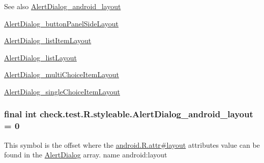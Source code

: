 \begin{DoxySeeAlso}{See also}
\hyperlink{classcheck_1_1test_1_1_r_1_1styleable_a3c776b8dc9750dc9868d3e65d915a53d}{Alert\+Dialog\+\_\+android\+\_\+layout} 

\hyperlink{classcheck_1_1test_1_1_r_1_1styleable_a929e9b246cebde3d26e0df79ede0734d}{Alert\+Dialog\+\_\+button\+Panel\+Side\+Layout} 

\hyperlink{classcheck_1_1test_1_1_r_1_1styleable_af8626e86eefaa84c9e393dc383c34a06}{Alert\+Dialog\+\_\+list\+Item\+Layout} 

\hyperlink{classcheck_1_1test_1_1_r_1_1styleable_ae130e7610181925120d23e9b40d846c5}{Alert\+Dialog\+\_\+list\+Layout} 

\hyperlink{classcheck_1_1test_1_1_r_1_1styleable_ae3a136130119ae9ebf31f7eb82968d0d}{Alert\+Dialog\+\_\+multi\+Choice\+Item\+Layout} 

\hyperlink{classcheck_1_1test_1_1_r_1_1styleable_a6be8c6aa13def4b95a7fa4ed71c5bda9}{Alert\+Dialog\+\_\+single\+Choice\+Item\+Layout} 
\end{DoxySeeAlso}
\hypertarget{classcheck_1_1test_1_1_r_1_1styleable_a3c776b8dc9750dc9868d3e65d915a53d}{}
\subsubsection[{Alert\+Dialog\+\_\+android\+\_\+layout}]{\setlength{\rightskip}{0pt plus 5cm}final int check.\+test.\+R.\+styleable.\+Alert\+Dialog\+\_\+android\+\_\+layout = 0\hspace{0.3cm}{\ttfamily [static]}}\label{classcheck_1_1test_1_1_r_1_1styleable_a3c776b8dc9750dc9868d3e65d915a53d}
This symbol is the offset where the \hyperlink{}{android.\+R.\+attr\#layout} attribute\textquotesingle{}s value can be found in the \hyperlink{classcheck_1_1test_1_1_r_1_1styleable_a1d9c160813dfdd546911e783935ebb65}{Alert\+Dialog} array.  name android\+:layout \hypertarget{classcheck_1_1test_1_1_r_1_1styleable_a929e9b246cebde3d26e0df79ede0734d}{}
